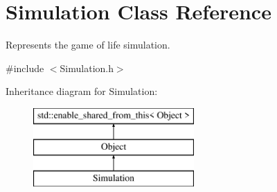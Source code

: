 \hypertarget{class_simulation}{}\section{Simulation Class Reference}
\label{class_simulation}


Represents the game of life simulation.  




{\ttfamily \#include $<$Simulation.\+h$>$}

Inheritance diagram for Simulation\+:\begin{figure}[H]
\begin{center}
\leavevmode
\includegraphics[height=3.000000cm]{class_simulation}
\end{center}
\end{figure}
